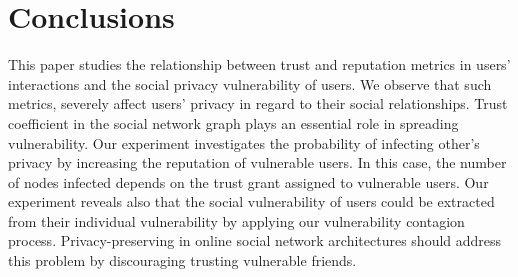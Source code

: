 \section{Conclusions} \label{sec:Conclusions}

This paper studies the relationship between trust and reputation metrics in users' interactions and the social privacy vulnerability of users.
We observe that such metrics,
	severely affect users’ privacy in regard to their social relationships.
Trust coefficient in the social network graph plays an essential role in spreading vulnerability.
Our experiment investigates the probability of infecting other's privacy by increasing the reputation of vulnerable users.
In this case,
	the number of nodes infected depends on the trust grant assigned to vulnerable users.
Our experiment  reveals also that the social vulnerability of users could be extracted from their individual vulnerability by applying our vulnerability contagion process.
Privacy-preserving in online social network architectures should address this problem by discouraging trusting vulnerable friends.
	



